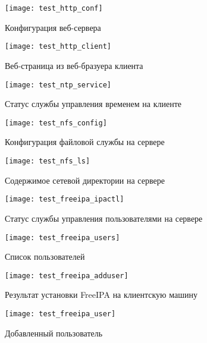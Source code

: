 \documentclass[14pt, a4paper]{extarticle}
\begin{document}
\begin{appendices}
\begin{figure}[H]
  \centering
  \texttt{[image: test\_http\_conf]}
  \caption{Конфигурация веб-сервера}
  \label{fig:test_http_conf}
\end{figure}

\begin{figure}[H]
  \centering
  \texttt{[image: test\_http\_client]}
  \caption{Веб-страница из веб-бразуера клиента}
  \label{fig:test_http_client}
\end{figure}

\begin{figure}[H]
  \centering
  \texttt{[image: test\_ntp\_service]}
  \caption{Статус службы управления временем на клиенте}
  \label{fig:test_ntp_service}
\end{figure}

\begin{figure}[H]
  \centering
  \texttt{[image: test\_nfs\_config]}
  \caption{Конфигурация файловой службы на сервере}
  \label{fig:test_nfs_config}
\end{figure}

\begin{figure}[H]
  \centering
  \texttt{[image: test\_nfs\_ls]}
  \caption{Содержимое сетевой директории на сервере}
  \label{fig:test_ntp_timedatectl}
\end{figure}

\begin{figure}[H]
  \centering
  \texttt{[image: test\_freeipa\_ipactl]}
  \caption{Статус службы управления пользователями на сервере}
  \label{fig:test_freeipa_ipactl}
\end{figure}

\begin{figure}[H]
  \centering
  \texttt{[image: test\_freeipa\_users]}
  \caption{Список пользователей}
  \label{fig:test_ntp_timedatectl}
\end{figure}

\begin{figure}[H]
  \centering
  \texttt{[image: test\_freeipa\_adduser]}
  \caption{Результат установки FreeIPA на клиентскую машину}
  \label{fig:test_ntp_adduser}
\end{figure}

\begin{figure}[H]
  \centering
  \texttt{[image: test\_freeipa\_user]}
  \caption{Добавленный пользователь}
  \label{fig:test_freeipa_user}
\end{figure}


\end{appendices}
\end{document}
